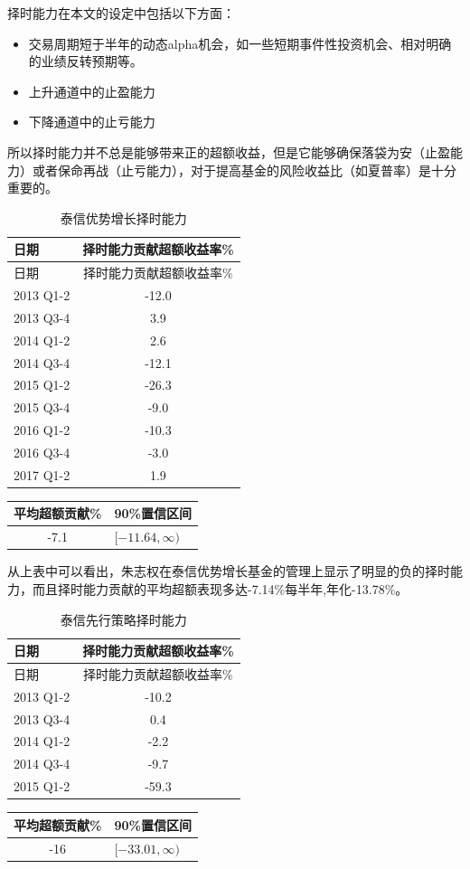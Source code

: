 \documentclass[hyperref,]{ctexart}
\providecommand{\tightlist}{%
  \setlength{\itemsep}{0pt}\setlength{\parskip}{0pt}}
\begin{document}
择时能力在本文的设定中包括以下方面：

\begin{itemize}
\tightlist
\item
  交易周期短于半年的动态alpha机会，如一些短期事件性投资机会、相对明确的业绩反转预期等。
\item
  上升通道中的止盈能力
\item
  下降通道中的止亏能力
\end{itemize}

所以择时能力并不总是能够带来正的超额收益，但是它能够确保落袋为安（止盈能力）或者保命再战（止亏能力），对于提高基金的风险收益比（如夏普率）是十分重要的。

\begin{longtable}[]{@{}lc@{}}
\caption{泰信优势增长择时能力}\tabularnewline
\toprule
日期 & 择时能力贡献超额收益率\%\tabularnewline
\midrule
\endfirsthead
\toprule
日期 & 择时能力贡献超额收益率\%\tabularnewline
\midrule
\endhead
2013 Q1-2 & -12.0\tabularnewline
2013 Q3-4 & 3.9\tabularnewline
2014 Q1-2 & 2.6\tabularnewline
2014 Q3-4 & -12.1\tabularnewline
2015 Q1-2 & -26.3\tabularnewline
2015 Q3-4 & -9.0\tabularnewline
2016 Q1-2 & -10.3\tabularnewline
2016 Q3-4 & -3.0\tabularnewline
2017 Q1-2 & 1.9\tabularnewline
\bottomrule
\end{longtable}

\begin{longtable}[]{@{}cl@{}}
\toprule
平均超额贡献\% & 90\%置信区间\tabularnewline
\midrule
\endhead
-7.1 & \([-11.64,\infty)\)\tabularnewline
\bottomrule
\end{longtable}

从上表中可以看出，朱志权在泰信优势增长基金的管理上显示了明显的负的择时能力，而且择时能力贡献的平均超额表现多达-7.14\%每半年,年化-13.78\%。

\begin{longtable}[]{@{}lc@{}}
\caption{泰信先行策略择时能力}\tabularnewline
\toprule
日期 & 择时能力贡献超额收益率\%\tabularnewline
\midrule
\endfirsthead
\toprule
日期 & 择时能力贡献超额收益率\%\tabularnewline
\midrule
\endhead
2013 Q1-2 & -10.2\tabularnewline
2013 Q3-4 & 0.4\tabularnewline
2014 Q1-2 & -2.2\tabularnewline
2014 Q3-4 & -9.7\tabularnewline
2015 Q1-2 & -59.3\tabularnewline
\bottomrule
\end{longtable}

\begin{longtable}[]{@{}cl@{}}
\toprule
平均超额贡献\% & 90\%置信区间\tabularnewline
\midrule
\endhead
-16 & \([-33.01,\infty)\)\tabularnewline
\bottomrule
\end{longtable}
\end{document}
